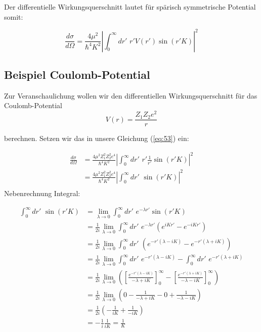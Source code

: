 Der differentielle Wirkungsquerschnitt lautet für spärisch symmetrische Potential somit:

\begin{equation}
  \label{eq:53}
  \boxed{ \frac{d\sigma}{d\Omega}=  \frac{4\mu^2}{\hbar^4 K^2} \left| \int_0^\infty dr'\,\, r'  V(r') \sin(r'K)   \right|^2 }
\end{equation}



\subsection{Beispiel Coulomb-Potential}


Zur Veranschaulichung wollen wir den differentiellen Wirkungsquerschnitt für das Coulomb-Potential 
\begin{equation}
  \label{eq:54}
  V(r) = \frac{Z_1Z_2e^2}{r}
\end{equation}

berechnen. Setzen wir das in unsere Gleichung (\ref{eq:53}) ein:

\begin{align}
  \label{eq:55}
  \frac{d\sigma}{d\Omega}&=  \frac{4\mu^2Z_1^2Z_2^2e^4}{\hbar^4 K^2} \left| \int_0^\infty dr'\,\, r'  \frac{1}{r'} \sin(r'K)   \right|^2 \\
&=  \frac{4\mu^2Z_1^2Z_2^2e^4}{\hbar^4 K^2} \left| \int_0^\infty dr'\,\, \sin(r'K)   \right|^2 \\
\end{align}
Nebenrechnung Integral:

\begin{align}
  \label{eq:56}
 \int_0^\infty dr'\,\, \sin(r'K) &= \lim_{\lambda \to 0} \int_0^\infty dr'\,\, e^{-\lambda r'}  \sin(r'K) \\
&= \frac{1}{2i}  \lim_{\lambda \to 0} \int_0^\infty dr'\,\, e^{-\lambda r'}\left( e^{iK r'}- e^{-iK r'} \right)  \\
&= \frac{1}{2i}  \lim_{\lambda \to 0} \int_0^\infty dr'\,\, \left( e^{-r'(\lambda - iK )}- e^{-r'(\lambda+iK)} \right)  \\
&= \frac{1}{2i}  \lim_{\lambda \to 0} \int_0^\infty dr'\,\, e^{-r'(\lambda - iK )}- \int_0^\infty dr'\,\, e^{-r'(\lambda+iK)}  \\
&= \frac{1}{2i}  \lim_{\lambda \to 0}\left( \left[ \frac{e^{-r'(\lambda - iK )} }{-\lambda+iK}  \right]_0^\infty - \left[ \frac{e^{-r'(\lambda + iK )} }{-\lambda-iK}  \right]_0^\infty \right) \\
&= \frac{1}{2i}  \lim_{\lambda \to 0}\left( 0 - \frac{1}{-\lambda+iK}   -  0  +  \frac{1}{-\lambda-iK}  \right) \\
&= \frac{1}{2i}  \left( -\frac{1}{iK}   +  \frac{1}{-iK}  \right) \\
&= - \frac{1}{i} \frac{1}{iK} =  \frac{1}{K} 
\end{align}

